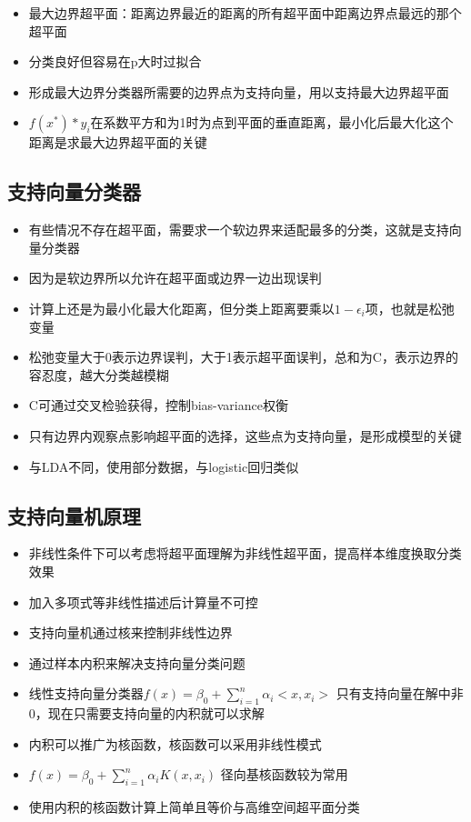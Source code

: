 \documentclass[
]{book}
\providecommand{\tightlist}{%
  \setlength{\itemsep}{0pt}\setlength{\parskip}{0pt}}
\begin{document}
\begin{itemize}
\tightlist
\item
  最大边界超平面：距离边界最近的距离的所有超平面中距离边界点最远的那个超平面
\item
  分类良好但容易在p大时过拟合
\item
  形成最大边界分类器所需要的边界点为支持向量，用以支持最大边界超平面
\item
  \(f(x^*)*y_i\)在系数平方和为1时为点到平面的垂直距离，最小化后最大化这个距离是求最大边界超平面的关键
\end{itemize}

\hypertarget{ux652fux6301ux5411ux91cfux5206ux7c7bux5668}{%
\subsection{支持向量分类器}\label{ux652fux6301ux5411ux91cfux5206ux7c7bux5668}}

\begin{itemize}
\tightlist
\item
  有些情况不存在超平面，需要求一个软边界来适配最多的分类，这就是支持向量分类器
\item
  因为是软边界所以允许在超平面或边界一边出现误判
\item
  计算上还是为最小化最大化距离，但分类上距离要乘以\(1 - \epsilon_i\)项，也就是松弛变量
\item
  松弛变量大于0表示边界误判，大于1表示超平面误判，总和为C，表示边界的容忍度，越大分类越模糊
\item
  C可通过交叉检验获得，控制bias-variance权衡
\item
  只有边界内观察点影响超平面的选择，这些点为支持向量，是形成模型的关键
\item
  与LDA不同，使用部分数据，与logistic回归类似
\end{itemize}

\hypertarget{ux652fux6301ux5411ux91cfux673aux539fux7406}{%
\subsection{支持向量机原理}\label{ux652fux6301ux5411ux91cfux673aux539fux7406}}

\begin{itemize}
\tightlist
\item
  非线性条件下可以考虑将超平面理解为非线性超平面，提高样本维度换取分类效果
\item
  加入多项式等非线性描述后计算量不可控
\item
  支持向量机通过核来控制非线性边界
\item
  通过样本内积来解决支持向量分类问题
\item
  线性支持向量分类器\(f(x) = \beta_0 + \sum_{i = 1}^{n} \alpha_i < x,x_i >\) 只有支持向量在解中非0，现在只需要支持向量的内积就可以求解
\item
  内积可以推广为核函数，核函数可以采用非线性模式
\item
  \(f(x) = \beta_0 + \sum_{i = 1}^{n} \alpha_i K( x,x_i )\) 径向基核函数较为常用
\item
  使用内积的核函数计算上简单且等价与高维空间超平面分类
\end{itemize}
\end{document}
